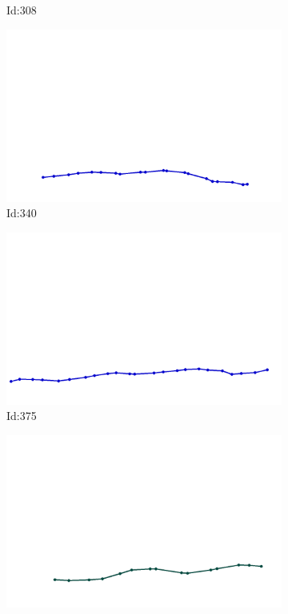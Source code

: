 \documentclass[12pt,twoside]{report}
\begin{document}
\begin{figure}
\begin{subfigure}[b]{0.20\textwidth}
\caption{Id:308}
\end{subfigure}
\begin{subfigure}[b]{0.20\textwidth}
\centering
\includegraphics[width=\textwidth]{../trajectories/340.png}
\caption{Id:340}
\end{subfigure}
\begin{subfigure}[b]{0.20\textwidth}
\centering
\includegraphics[width=\textwidth]{../trajectories/375.png}
\caption{Id:375}
\end{subfigure}
\begin{subfigure}[b]{0.20\textwidth}
\centering
\includegraphics[width=\textwidth]{../trajectories/381.png}

\end{subfigure}
\end{figure}
\end{document}
